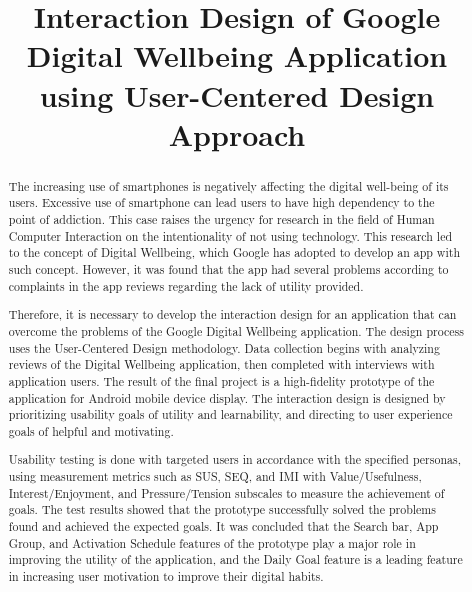 \documentclass[conference]{IEEEtran}
\begin{document}
\title{Interaction Design of Google Digital Wellbeing Application using User-Centered Design Approach}

\author{
  \and
}

\maketitle

\begin{abstract}
  The increasing use of smartphones is negatively affecting the digital well-being of its users. Excessive use of smartphone can lead users to have high dependency to the point of addiction. This case raises the urgency for research in the field of Human Computer Interaction on the intentionality of not using technology. This research led to the concept of Digital Wellbeing, which Google has adopted to develop an app with such concept. However, it was found that the app had several problems according to complaints in the app reviews regarding the lack of utility provided.

  Therefore, it is necessary to develop the interaction design for an application that can overcome the problems of the Google Digital Wellbeing application. The design process uses the User-Centered Design methodology. Data collection begins with analyzing reviews of the Digital Wellbeing application, then completed with interviews with application users. The result of the final project is a high-fidelity prototype of the application for Android mobile device display. The interaction design is designed by prioritizing usability goals of utility and learnability, and directing to user experience goals of helpful and motivating.

  Usability testing is done with targeted users in accordance with the specified personas, using measurement metrics such as SUS, SEQ, and IMI with Value/Usefulness, Interest/Enjoyment, and Pressure/Tension subscales to measure the achievement of goals. The test results showed that the prototype successfully solved the problems found and achieved the expected goals. It was concluded that the Search bar, App Group, and Activation Schedule features of the prototype play a major role in improving the utility of the application, and the Daily Goal feature is a leading feature in increasing user motivation to improve their digital habits.
  
\end{abstract}
\end{document}
